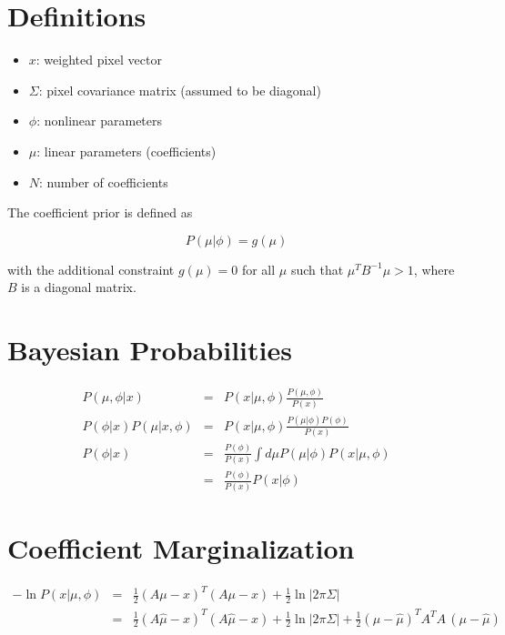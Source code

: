 \documentclass{amsart}
\begin{document}
\section{Definitions}

\begin{itemize}
\item $x$: weighted pixel vector
\item $\Sigma$: pixel covariance matrix (assumed to be diagonal)
\item $\phi$: nonlinear parameters
\item $\mu$: linear parameters (coefficients)
\item $N$: number of coefficients
\end{itemize}

The coefficient prior is defined as

\begin{equation}
  P(\mu|\phi) = g(\mu)
\end{equation}

with the additional constraint $g(\mu) = 0$ for all $\mu$ such that
$\mu^T B^{-1} \mu > 1$, where $B$ is a diagonal matrix.

\section{Bayesian Probabilities}

\begin{eqnarray}
  P(\mu,\phi|x) &=& P(x|\mu,\phi)
  \frac{P(\mu,\phi)}{P(x)} \\
  P(\phi|x)P(\mu|x,\phi) &=&
  P(x|\mu,\phi)\frac{P(\mu|\phi) P(\phi)}{P(x)}
  \\
  P(\phi|x) &=& \frac{P(\phi)}{P(x)}
  \int d\mu P(\mu|\phi) P(x|\mu,\phi) \\
  &=& \frac{P(\phi)}{P(x)} P(x|\phi)
\end{eqnarray}

\section{Coefficient Marginalization}

\begin{eqnarray}
  -\ln P(x|\mu,\phi) &=& \frac{1}{2}(A\mu-x)^T(A\mu-x)
  +\frac{1}{2}\ln\left|2\pi\Sigma\right| \\
  &=& \frac{1}{2}(A\hat{\mu}-x)^T(A\hat{\mu}-x)
  +\frac{1}{2}\ln\left|2\pi\Sigma\right| 
  +\frac{1}{2}(\mu - \hat{\mu})^T\!A^T\!A\,(\mu-\hat{\mu})
\end{eqnarray}
\end{document}
